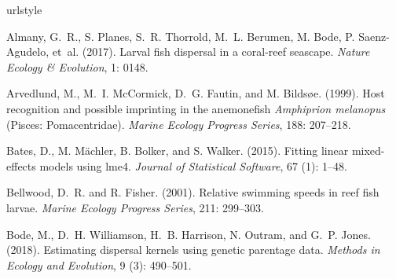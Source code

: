\documentclass[12pt, oneside]{article}   	%
\begin{document}
\newcommand{\noop}[1]{}
\begin{thebibliography}{66}
\providecommand{\natexlab}[1]{#1}
\providecommand{\url}[1]{\texttt{#1}}
\expandafter\ifx\csname urlstyle\endcsname\relax
  \providecommand{\doi}[1]{doi: #1}\else
  \providecommand{\doi}{doi: \begingroup \urlstyle{rm}\Url}\fi

Almany, G.~R., S. Planes, S.~R. Thorrold, M.~L. Berumen, M. Bode, P. Saenz-Agudelo, et~al. (2017).
\newblock Larval fish dispersal in a coral-reef seascape.
\newblock \emph{Nature Ecology \& Evolution}, 1: 0148.

Arvedlund, M., M.~I. McCormick, D.~G. Fautin, and M. Bilds{\o}e. (1999).
\newblock Host recognition and possible imprinting in the anemonefish
  \textit{Amphiprion melanopus} (Pisces: Pomacentridae).
\newblock \emph{Marine Ecology Progress Series}, 188: 207--218.


Bates, D., M. M{\"a}chler, B. Bolker, and S. Walker. (2015).
\newblock Fitting linear mixed-effects models using {lme4}.
\newblock \emph{Journal of Statistical Software}, 67 (1):
  1--48.

Bellwood, D.~R. and R. Fisher. (2001).
\newblock Relative swimming speeds in reef fish larvae.
\newblock \emph{Marine Ecology Progress Series}, 211: 299--303.

Bode, M., D.~H. Williamson, H.~B. Harrison, N. Outram, and G.~P.
  Jones. (2018).
\newblock Estimating dispersal kernels using genetic parentage data.
\newblock \emph{Methods in Ecology and Evolution}, 9 (3):
  490--501.


\end{thebibliography}
\end{document}
